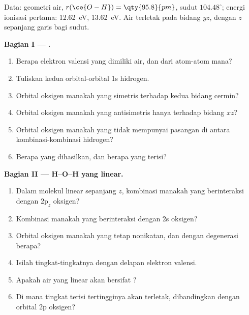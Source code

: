 \begin{problem}
\label{pb:b2:fragment-orbitals:1}
Data: geometri air, $r(\ce{O-H}) = \qty{95.8}{pm}$, sudut $104.48^\circ$;
energi ionisasi pertama:  \qty{12.62}{eV}, 
\qty{13.62}{eV}. Air terletak pada bidang $yz$, dengan $z$ sepanjang garis
bagi sudut.

\medskip
\noindent\textbf{Bagian I --- .}
\begin{enumerate}
  \item Berapa elektron valensi yang dimiliki air, dan dari atom-atom mana?
  \item Tuliskan kedua  orbital-orbital 1s
        hidrogen.
  \item Orbital oksigen manakah yang simetris terhadap kedua bidang cermin?
  \item Orbital oksigen manakah yang antisimetris hanya terhadap bidang
        $xz$?
  \item Orbital oksigen manakah yang tidak mempunyai pasangan di antara
        kombinasi-kombinasi hidrogen?
  \item Berapa  yang dihasilkan, dan berapa yang terisi?
\end{enumerate}

\medskip
\noindent\textbf{Bagian II --- H--O--H yang linear.}
\begin{enumerate}[resume]
  \item Dalam molekul linear sepanjang $z$, kombinasi manakah yang
        berinteraksi dengan $2\mathrm p_z$ oksigen?
  \item Kombinasi manakah yang berinteraksi dengan 2s oksigen?
  \item Orbital oksigen manakah yang tetap nonikatan, dan dengan degenerasi
        berapa?
  \item Isilah tingkat-tingkatnya dengan delapan elektron valensi.
  \item Apakah air yang linear akan bersifat ?
  \item Di mana tingkat terisi tertingginya akan terletak, dibandingkan
        dengan orbital 2p oksigen?
\end{enumerate}


\end{problem}
